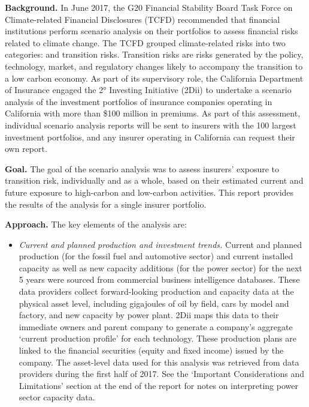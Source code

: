 \documentclass[10pt,table,a4]{article}\usepackage[]{graphicx}\usepackage[]{color}
\begin{document}
	\begin{multicols}{2}
		\textbf{Background.} In June 2017, the G20 Financial Stability Board Task Force on Climate-related Financial Disclosures (TCFD) recommended that financial institutions perform scenario analysis on their portfolios to assess financial risks related to climate change. The TCFD grouped climate-related risks into two categories:  and transition risks. Transition risks are risks generated by the policy, technology, market, and regulatory changes likely to accompany the transition to a low carbon economy. As part of its supervisory role, the California Department of Insurance engaged the 2° Investing Initiative (2Dii) to undertake a scenario analysis of the investment portfolios of insurance companies operating in California with more than \$100 million in premiums.  As part of this assessment, individual scenario analysis reports will be sent to insurers with the 100 largest investment portfolios, and any insurer operating in California can request their own report.
		
		\textbf{Goal.} The goal of the scenario analysis was to assess insurers' exposure to transition risk, individually and as a whole, based on their estimated current and future exposure to high-carbon and low-carbon activities. This report provides the results of the analysis for a single insurer portfolio.
		
		\textbf{Approach.} The key elements of the analysis are:
		
		\begin{itemize}
			\item{\textit{Current and planned production and investment trends.} Current and planned production (for the fossil fuel and automotive sector) and current installed capacity as well as new capacity additions (for the power sector) for the next 5 years were sourced from commercial business intelligence databases. These data providers collect forward-looking production and capacity data at the physical asset level, including gigajoules of oil by field, cars by model and factory, and new capacity by power plant. 2Dii maps this data to their immediate owners and parent company to generate a company's aggregate `current production profile' for each technology. These production plans are linked to the financial securities (equity and fixed income) issued by the company. The asset-level data used for this analysis was retrieved from data providers during the first half of 2017. See the `Important Considerations and Limitations' section at the end of the report for notes on interpreting power sector capacity data.}
			

\end{itemize}
\end{multicols}
\end{document}
